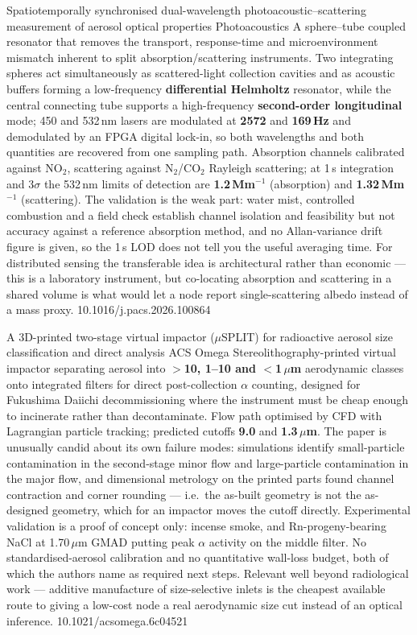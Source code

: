 \documentclass[10pt]{article}
\begin{document}

{Spatiotemporally synchronised dual-wavelength photoacoustic--scattering measurement of aerosol optical properties}
{Photoacoustics}
{A sphere--tube coupled resonator that removes the transport, response-time and
microenvironment mismatch inherent to split absorption/scattering instruments. Two
integrating spheres act simultaneously as scattered-light collection cavities and as
acoustic buffers forming a low-frequency \textbf{differential Helmholtz} resonator, while
the central connecting tube supports a high-frequency \textbf{second-order longitudinal}
mode; 450 and 532\,nm lasers are modulated at \textbf{2572} and \textbf{169\,Hz} and
demodulated by an FPGA digital lock-in, so both wavelengths and both quantities are
recovered from one sampling path. Absorption channels calibrated against NO$_2$,
scattering against N$_2$/CO$_2$ Rayleigh scattering; at 1\,s integration and 3$\sigma$
the 532\,nm limits of detection are \textbf{1.2\,Mm$^{-1}$} (absorption) and
\textbf{1.32\,Mm$^{-1}$} (scattering). The validation is the weak part: water mist,
controlled combustion and a field check establish channel isolation and feasibility but
not accuracy against a reference absorption method, and no Allan-variance drift figure is
given, so the 1\,s LOD does not tell you the useful averaging time. For distributed
sensing the transferable idea is architectural rather than economic --- this is a
laboratory instrument, but co-locating absorption and scattering in a shared volume is
what would let a node report single-scattering albedo instead of a mass proxy.}
{10.1016/j.pacs.2026.100864}

{A 3D-printed two-stage virtual impactor ($\mu$SPLIT) for radioactive aerosol size classification and direct analysis}
{ACS Omega}
{Stereolithography-printed virtual impactor separating aerosol into \textbf{$>$10,
1--10 and $<$1\,$\mu$m} aerodynamic classes onto integrated filters for direct
post-collection $\alpha$ counting, designed for Fukushima Daiichi decommissioning where
the instrument must be cheap enough to incinerate rather than decontaminate. Flow path
optimised by CFD with Lagrangian particle tracking; predicted cutoffs \textbf{9.0} and
\textbf{1.3\,$\mu$m}. The paper is unusually candid about its own failure modes:
simulations identify small-particle contamination in the second-stage minor flow and
large-particle contamination in the major flow, and dimensional metrology on the printed
parts found channel contraction and corner rounding --- i.e.\ the as-built geometry is
not the as-designed geometry, which for an impactor moves the cutoff directly.
Experimental validation is a proof of concept only: incense smoke, and Rn-progeny-bearing
NaCl at 1.70\,$\mu$m GMAD putting peak $\alpha$ activity on the middle filter. No
standardised-aerosol calibration and no quantitative wall-loss budget, both of which the
authors name as required next steps. Relevant well beyond radiological work --- additive
manufacture of size-selective inlets is the cheapest available route to giving a
low-cost node a real aerodynamic size cut instead of an optical inference.}
{10.1021/acsomega.6c04521}
\end{document}
